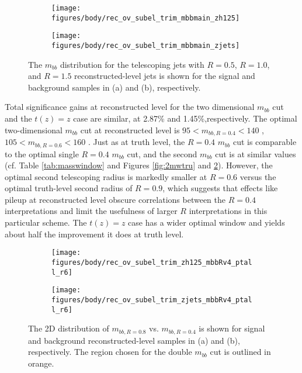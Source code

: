 \begin{figure}[!htbp]\captionsetup{justification=centering}
\begin{center}
\begin{subfigure}[t]{0.49\textwidth}\centering\texttt{[image: figures/body/rec\_ov\_subel\_trim\_mbbmain\_zh125]}\caption{}\end{subfigure}
\begin{subfigure}[t]{0.49\textwidth}\centering\texttt{[image: figures/body/rec\_ov\_subel\_trim\_mbbmain\_zjets]}\caption{}\end{subfigure}
\caption{\label{fig:multradrec}The $m_{bb}$ distribution for the telescoping jets with $R=0.5$, $R=1.0$, and $R=1.5$ reconstructed-level jets is shown for the signal and background samples in (a) and (b), respectively.}
\end{center}
\end{figure}

Total significance gains at reconstructed level for the two dimensional $m_{bb}$ cut and the $t\left(z\right)=z$ case are similar, at 2.87\% and 1.45\%,respectively.  The optimal two-dimensional $m_{bb}$ cut at reconstructed level is $95<m_{bb,R=0.4}<140$ \GeV, $105<m_{bb,R=0.6}<160$ \GeV.  Just as at truth level, the $R=0.4$ $m_{bb}$ cut is comparable to the optimal single $R=0.4$ $m_{bb}$ cut, and the second $m_{bb}$ cut is at similar values (cf. Table \ref{tab:masswindow} and Figures \ref{fig:2mwtru} and \ref{fig:2mwrec}).  However, the optimal second telescoping radius is markedly smaller at $R=0.6$ versus the optimal truth-level second radius of $R=0.9$, which suggests that effects like pileup at reconstructed level obscure correlations between the $R=0.4$ interpretations and limit the usefulness of larger $R$ interpretations in this particular scheme. The $t\left(z\right)=z$ case has a wider optimal window and yields about half the improvement it does at truth level.%

\begin{figure}[!htbp]\captionsetup{justification=centering}
\begin{center}
\begin{subfigure}[t]{0.49\textwidth}\centering\texttt{[image: figures/body/rec\_ov\_subel\_trim\_zh125\_mbbRv4\_ptall\_r6]}\caption{}\end{subfigure}
\begin{subfigure}[t]{0.49\textwidth}\centering\texttt{[image: figures/body/rec\_ov\_subel\_trim\_zjets\_mbbRv4\_ptall\_r6]}\caption{}\end{subfigure}
\caption{\label{fig:2mwrec}The 2D distribution of $m_{bb,R=0.8}$ vs. $m_{bb,R=0.4}$ is shown for signal and background re\-constructed-level samples in (a) and (b), respectively.  The region chosen for the double $m_{bb}$ cut is outlined in orange.}
\end{center}
\end{figure}

